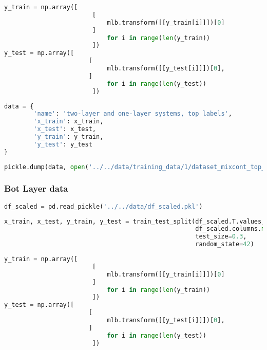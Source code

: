 \begin{lstlisting}[language=Python]
y_train = np.array([    
                        [
                            mlb.transform([[y_train[i]]])[0]
                        ] 
                            for i in range(len(y_train))
                        ])
y_test = np.array([ 
                       [
                            mlb.transform([[y_test[i]]])[0],
                       ] 
                            for i in range(len(y_test))
                        ])
\end{lstlisting}

\begin{lstlisting}[language=Python]
data = {
        'name': 'two-layer and one-layer systems, top labels',
        'x_train': x_train,
        'x_test': x_test,
        'y_train': y_train,
        'y_test': y_test
}
\end{lstlisting}

\begin{lstlisting}[language=Python]
pickle.dump(data, open('../../data/training_data/1/dataset_mixcont_top_layer.pkl', 'wb'))
\end{lstlisting}

\hypertarget{bot-layer-data}{%
\subsubsection{Bot Layer data}\label{bot-layer-data}}

\begin{lstlisting}[language=Python]
df_scaled = pd.read_pickle('../../data/df_scaled.pkl')
\end{lstlisting}

\begin{lstlisting}[language=Python]
x_train, x_test, y_train, y_test = train_test_split(df_scaled.T.values,
                                                    df_scaled.columns.map(lambda x: x.split('_')[1]), # second part of the filename is the bot label
                                                    test_size=0.3,
                                                    random_state=42)
\end{lstlisting}

\begin{lstlisting}[language=Python]
y_train = np.array([    
                        [
                            mlb.transform([[y_train[i]]])[0]
                        ] 
                            for i in range(len(y_train))
                        ])
y_test = np.array([ 
                       [
                            mlb.transform([[y_test[i]]])[0],
                       ] 
                            for i in range(len(y_test))
                        ])
\end{lstlisting}

